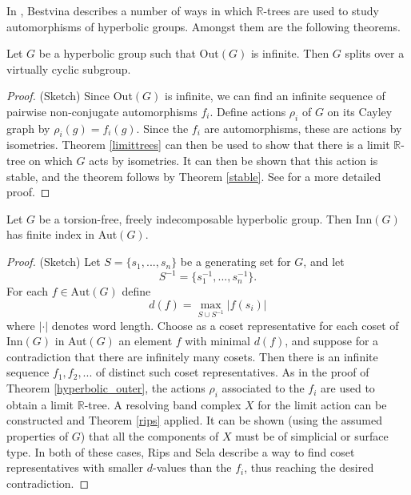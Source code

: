 \subsubsection{} 
In \cite{Bestvina_trees}, Bestvina describes a number of ways in which $\mathbb{R}$-trees are used to study automorphisms of hyperbolic groups. Amongst them are the following theorems.
\begin{theorem}\label{hyperbolic_outer}
    Let $G$ be a hyperbolic group such that Out$(G)$ is infinite. Then $G$ splits over a virtually cyclic subgroup.
\end{theorem}

\begin{proof} (Sketch)
    Since Out$(G)$ is infinite, we can find an infinite sequence of pairwise non-conjugate automorphisms $f_i$. Define actions $\rho_i$ of $G$ on its Cayley graph by $\rho_i(g)=f_i(g)$. %
    Since the $f_i$ are automorphisms, these are actions by isometries. Theorem \ref{limittrees} can then be used to show that there is a limit $\mathbb{R}$-tree on which $G$ acts by isometries. It can then be shown that this action is stable, and the theorem follows by Theorem \ref{stable}. See \cite{Bestvina_trees} for a more detailed proof.
\end{proof}

\begin{theorem}
    Let $G$ be a torsion-free, freely indecomposable hyperbolic group. Then Inn$(G)$ has finite index in Aut$(G)$.
\end{theorem}
\begin{proof}
    (Sketch) Let $S=\{s_1,...,s_n\}$ be a generating set for $G$, and let \[S^{-1}=\{s_1^{-1},...,s_n^{-1}\}.\] For each $f\in \text{Aut}(G)$ define \[d(f)=\max_{S\cup S^{-1}}\lvert f(s_i)\rvert\] where $\lvert \cdot \rvert$ denotes word length. Choose as a coset representative for each coset of Inn$(G)$ in Aut$(G)$ an element $f$ with minimal $d(f)$, and suppose for a contradiction that there are infinitely many cosets. Then there is an infinite sequence $f_1,f_2,...$ of distinct such coset representatives. As in the proof of Theorem \ref{hyperbolic_outer}, the actions $\rho_i$ associated to the $f_i$ are used to obtain a limit $\mathbb{R}$-tree. A resolving band complex $X$ for the limit action can be constructed and Theorem \ref{rips} applied. It can be shown (using the assumed properties of $G$) that all the components of $X$ must be of simplicial or surface type. In both of these cases, Rips and Sela describe a way to find coset representatives with smaller $d$-values than the $f_i$, thus reaching the desired contradiction.
\end{proof}

